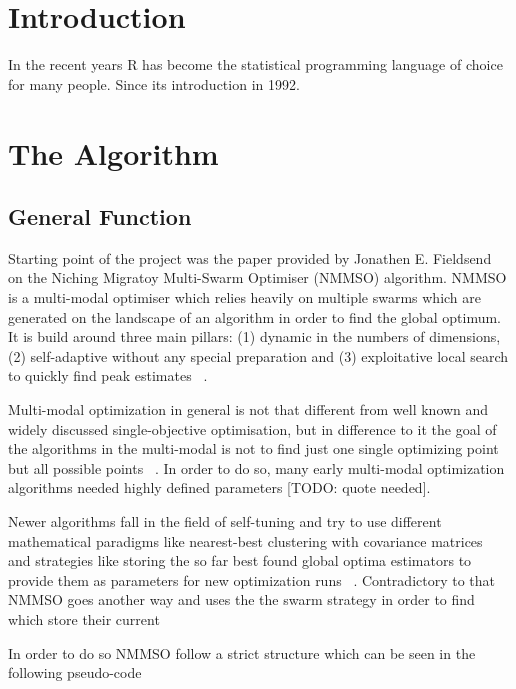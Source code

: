 \section{Introduction}
\label{introduction}

In the recent years R has become the statistical programming language of choice for many people. Since its introduction in 1992. 

\pagebreak 

\section{The Algorithm}
\label{thealgorithm}

\subsection{General Function}
\label{generalfunction}

Starting point of the project was the paper provided by Jonathen E. Fieldsend ~\citep{fieldsend_2014} on the Niching Migratoy Multi-Swarm Optimiser (NMMSO) algorithm. NMMSO is a multi-modal optimiser which relies heavily on multiple swarms which are generated on the landscape of an algorithm in order to find the global optimum. It is build around three main pillars: (1) dynamic in the numbers of dimensions, (2) self-adaptive without any special preparation and (3) exploitative local search to quickly find peak estimates ~\citep[p. 1]{fieldsend_2014}. 

Multi-modal optimization in general is not that different from well known and widely discussed single-objective optimisation, but in difference to it the goal of the algorithms in the multi-modal is not to find just one single optimizing point but all possible points ~\citep[p. 1]{fieldsend_2014}. In order to do so, many early multi-modal optimization algorithms needed highly defined parameters [TODO: quote needed]. 

Newer algorithms fall in the field of self-tuning and try to use different mathematical paradigms like nearest-best clustering with covariance matrices ~\citep{preuss_2010} and strategies like storing the so far best found global optima estimators to provide them as parameters for new optimization runs ~\citep{epitropakis_2013}. Contradictory to that NMMSO goes another way and uses the the swarm strategy in order to find which store their current ~\citep{fieldsend_2014}

In order to do so NMMSO follow a strict structure which can be seen in the following pseudo-code


